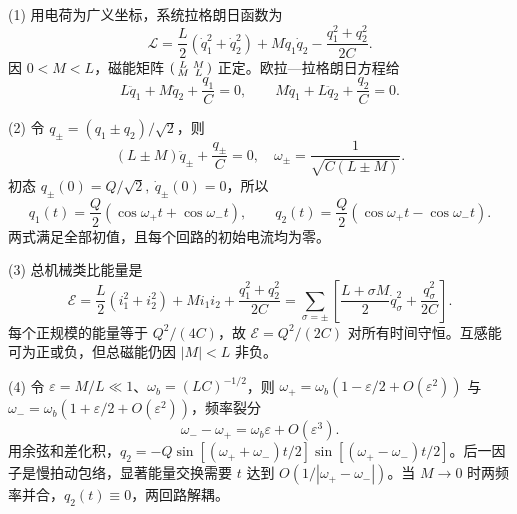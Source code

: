 (1) 用电荷为广义坐标，系统拉格朗日函数为
\[
\mathcal L=\frac L2(\dot q_1^2+\dot q_2^2)+M\dot q_1\dot q_2-\frac{q_1^2+q_2^2}{2C}.
\]
因 \(0<M<L\)，磁能矩阵 \(\begin{psmallmatrix}L&M\\M&L\end{psmallmatrix}\) 正定。欧拉—拉格朗日方程给
\[
L\ddot q_1+M\ddot q_2+\frac{q_1}{C}=0,\qquad
M\ddot q_1+L\ddot q_2+\frac{q_2}{C}=0.
\]

(2) 令 \(q_\pm=(q_1\pm q_2)/\sqrt2\)，则
\[
(L\pm M)\ddot q_\pm+\frac{q_\pm}{C}=0,\quad
\omega_\pm=\frac1{\sqrt{C(L\pm M)}}.
\]
初态 \(q_\pm(0)=Q/\sqrt2,\ \dot q_\pm(0)=0\)，所以
\[
q_1(t)=\frac Q2(\cos\omega_+t+\cos\omega_-t),\qquad
q_2(t)=\frac Q2(\cos\omega_+t-\cos\omega_-t).
\]
两式满足全部初值，且每个回路的初始电流均为零。

(3) 总机械类比能量是
\[
\mathcal E=\frac L2(i_1^2+i_2^2)+Mi_1i_2+\frac{q_1^2+q_2^2}{2C}
=\sum_{\sigma=\pm}\left[\frac{L+\sigma M}{2}\dot q_\sigma^2+\frac{q_\sigma^2}{2C}\right].
\]
每个正规模的能量等于 \(Q^2/(4C)\)，故 \(\mathcal E=Q^2/(2C)\) 对所有时间守恒。互感能可为正或负，但总磁能仍因 \(|M|<L\) 非负。

(4) 令 \(\varepsilon=M/L\ll1\)、\(\omega_b=(LC)^{-1/2}\)，则 \(\omega_+=\omega_b(1-\varepsilon/2+O(\varepsilon^2))\) 与 \(\omega_-=\omega_b(1+\varepsilon/2+O(\varepsilon^2))\)，频率裂分
\[
\omega_--\omega_+=\omega_b\varepsilon+O(\varepsilon^3).
\]
用余弦和差化积，\(q_2=-Q\sin[(\omega_++\omega_-)t/2]\sin[(\omega_+-\omega_-)t/2]\)。后一因子是慢拍动包络，显著能量交换需要 \(t\) 达到 \(O(1/|\omega_+-\omega_-|)\)。当 \(M\to0\) 时两频率并合，\(q_2(t)\equiv0\)，两回路解耦。
